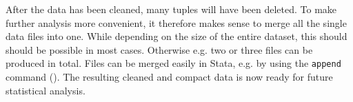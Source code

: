After the data has been cleaned, many tuples will have been deleted. To make further analysis more convenient, it therefore makes sense to merge all the single data files into one. While depending on the size of the entire dataset, this should should be possible in most cases. Otherwise e.g. two or three files can be produced in total. Files can be merged easily in Stata, e.g. by using the \lstinline{append} command (). %
The resulting cleaned and compact data is now ready for future statistical analysis. 